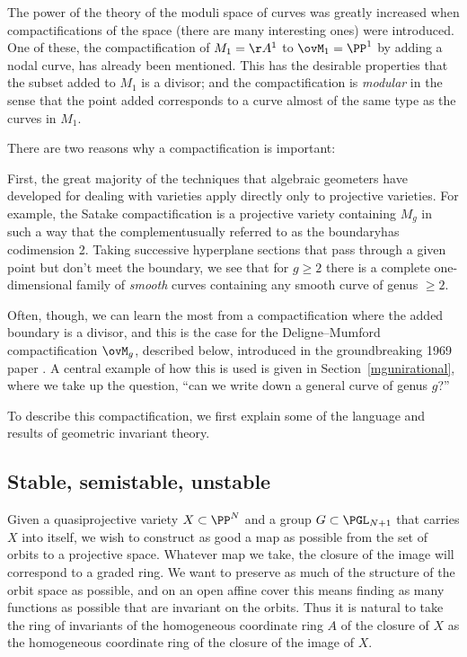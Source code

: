 The power of the theory of the moduli space of curves was greatly increased when compactifications of the space (there are many interesting ones) were introduced. One of these, the compactification
%
of $M_1 = \AA^1$ to $\ovM_1 = \PP^1$ by adding a nodal curve, has already been mentioned. This has the desirable properties that the subset added to $M_1$ is a divisor; and the compactification is \emph{modular} in the sense
that the point added corresponds to a curve almost of the same type as the curves in $M_1$.

There are two reasons why a compactification is  important:
%
%

First, the great majority of the techniques that algebraic geometers
have developed for dealing with varieties apply directly only to
projective varieties. For example, the
Satake compactification
%
is a projective variety containing $M_g$ in such a way that the
complement\emdash usually referred to as the
boundary\emdash has
codimension 2. Taking successive hyperplane sections that pass through
a given point but don't meet the boundary, we see that for $g\geq 2$
there is a complete one-dimensional family of \emph{smooth} curves
containing any smooth curve of genus $\geq 2$.

Often, though, we can learn the most from a compactification where the
added boundary
is a divisor, and this is the case for the Deligne--Mumford compactification
%
$\ovM_g$, described below,  introduced
in the
groundbreaking 1969 paper \cite{Deligne-Mumford}.
A central example of how this is used is given in
Section~\ref{mgunirational}, where we take up the question, ``can we
write down a general curve of genus $g$?''

To describe this compactification, we first explain some of the language and results of geometric
invariant theory.

\subsection*{Stable, semistable, unstable}

Given a quasiprojective variety $X \subset \PP^N$ and a group $G \subset \PGL_{N+1}$ that carries $X$ into itself, we wish to construct as good a map as possible from the set of orbits
to a projective space. Whatever map we take, the closure of the
image will correspond to a graded ring. We want to preserve as much of the structure of the orbit space as possible, and on an open affine cover
this means finding as many functions as possible that are invariant on
the orbits. Thus it is natural to take the
ring of invariants
%
%
of the homogeneous coordinate ring $A$ of the closure of $X$ as the homogeneous coordinate ring of the closure
of the image of $X$.

